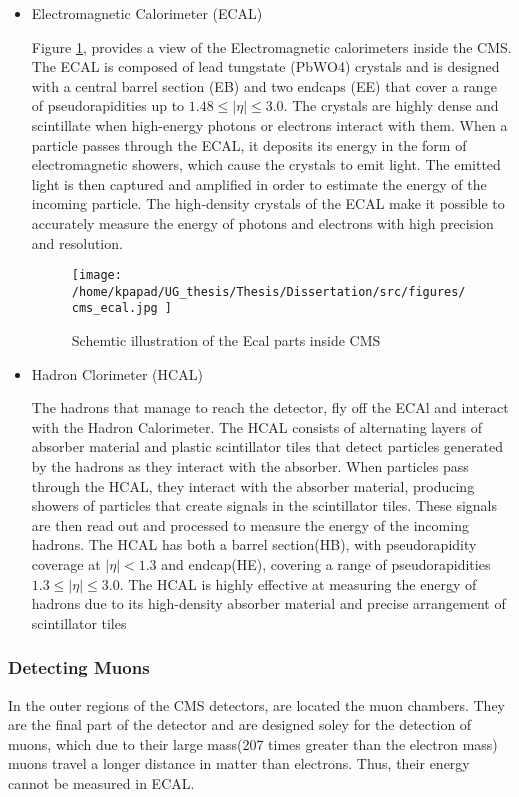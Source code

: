 \begin{itemize}
\item Electromagnetic Calorimeter (ECAL)
\label{sec:org54126fa}

Figure \ref{fig:cms_ecal}\cite{mac-2014}, provides a view of the Electromagnetic calorimeters inside the CMS. The ECAL is composed of lead tungstate (PbWO4) crystals and is designed with a central barrel section (EB) and two endcaps (EE) that cover a range of pseudorapidities up to \(1.48\leq|\eta| \leq 3.0\)\cite{Biino_2015}. The crystals are highly dense and scintillate when high-energy photons or electrons interact with them. When a particle passes through the ECAL, it deposits its energy in the form of electromagnetic showers, which cause the crystals to emit light. The emitted light is then captured and amplified in order to estimate the energy of the incoming particle. The high-density crystals of the ECAL make it possible to accurately measure the energy of photons and electrons with high precision and resolution. 

\begin{figure}[ht]
\centering
\texttt{[image: /home/kpapad/UG\_thesis/Thesis/Dissertation/src/figures/cms\_ecal.jpg ]}
\caption{Schemtic illustration of the Ecal parts inside CMS }
\label{fig:cms_ecal}
\end{figure}


\item Hadron Clorimeter (HCAL)
\label{sec:orgbfeffb5}

The hadrons that manage to reach the detector, fly off the ECAl and interact with the Hadron Calorimeter. The HCAL consists of alternating layers of absorber material and plastic scintillator tiles that detect particles generated by the hadrons as they interact with the absorber.  When particles pass through the HCAL, they interact with the absorber material, producing showers of particles that create signals in the scintillator tiles. These signals are then read out and processed to measure the energy of the incoming hadrons. The HCAL has both a barrel section(HB), with pseudorapidity coverage at \(|\eta|<1.3\) and endcap(HE), covering a range of pseudorapidities \(1.3\leq|\eta| \leq 3.0\). The HCAL is highly effective at measuring the energy of hadrons due to its high-density absorber material and precise arrangement of scintillator tiles\cite{HcalLecture}
\end{itemize}

\subsubsection{Detecting Muons}
\label{sec:org8c95f86}
In the outer regions of the CMS detectors, are located the muon chambers. They are the final part of the detector and are designed soley for the detection of muons, which due to their large mass(207 times greater than the electron mass) muons travel a longer distance in matter than electrons. Thus, their energy cannot be measured in ECAL. 

